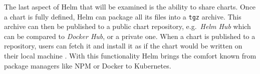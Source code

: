 The last aspect of Helm that will be examined is the ability to share 
charts. Once a chart is fully defined, Helm can package all its files into a
\texttt{tgz} archive. This archive can then be published to a public chart
repository, e.g.\ \textit{Helm Hub} which can be compared to \textit{Docker
Hub}, or a private one. When a chart is published to a repository, users can
fetch it and install it as if the chart would be written on their local
machine \autocite{HelmDocumentationCharts}. With this functionality Helm brings
the comfort known from package managers like \ac{NPM} or Docker to Kubernetes.
